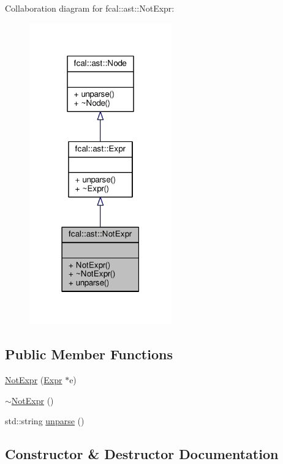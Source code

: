 Collaboration diagram for fcal\+:\+:ast\+:\+:Not\+Expr\+:
\nopagebreak
\begin{figure}[H]
\begin{center}
\leavevmode
\includegraphics[width=174pt]{classfcal_1_1ast_1_1NotExpr__coll__graph}
\end{center}
\end{figure}
\subsection*{Public Member Functions}
\begin{DoxyCompactItemize}
\item 
\hyperlink{classfcal_1_1ast_1_1NotExpr_a440b33c0fe1f0fe83ac1c0e8f3822052}{Not\+Expr} (\hyperlink{classfcal_1_1ast_1_1Expr}{Expr} $\ast$e)
\item 
\hyperlink{classfcal_1_1ast_1_1NotExpr_ad1528d05ab5a189dd0ec15d00ef14435}{$\sim$\+Not\+Expr} ()
\item 
std\+::string \hyperlink{classfcal_1_1ast_1_1NotExpr_a46f164e673738d573c8616c70c26159f}{unparse} ()
\end{DoxyCompactItemize}


\subsection{Constructor \& Destructor Documentation}
